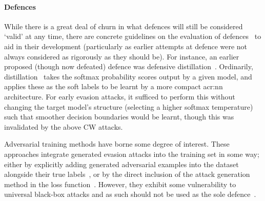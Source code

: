 %

\paragraph{Defences}
While there is a great deal of churn in what defences will still be considered `valid' at any time, there are concrete guidelines on the evaluation of defences~\parencite{DBLP:journals/corr/abs-1902-06705} to aid in their development (particularly as earlier attempts at defence were not always considered as rigorously as they should be).
For instance, an earlier proposed (though now defeated) defence was defensive distillation~\parencite{DBLP:conf/sp/PapernotM0JS16}.
Ordinarily, distillation~\parencite{DBLP:journals/corr/HintonVD15} takes the softmax probability scores output by a given model, and applies these as the soft labels to be learnt by a more compact \gls{acr:nn} architecture.
For early evasion attacks, it sufficed to perform this without changing the target model's structure (selecting a higher softmax temperature) such that smoother decision boundaries would be learnt, though this was invalidated by the above CW attacks.


Adversarial training methods have borne some degree of interest.
These approaches integrate generated evasion attacks into the training set in some way; either by explicitly adding generated adversarial examples into the dataset alongside their true labels~\parencite{DBLP:journals/corr/abs-1712-09196}, or by the direct inclusion of the attack generation method in the loss function~\parencite{DBLP:conf/iclr/MadryMSTV18}.
However, they exhibit some vulnerability to universal black-box attacks and as such should not be used as the sole defence~\parencite{DBLP:conf/iclr/TramerKPGBM18}.

